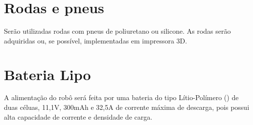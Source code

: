 \vspace{0.5cm}
\section{Rodas e pneus} \label{cap:rodas}
Serão utilizadas rodas com pneus de poliuretano ou silicone. As rodas serão adquiridas ou, se possível, implementadas em 
impressora 3D.


\vspace{0.5cm}
\section{Bateria Lipo} \label{cap:bateria}

A alimentação do robô será feita por uma bateria do tipo Lítio-Polímero () de duas céluas, 11,1V, 300mAh e 
32,5A de corrente máxima de descarga, pois possui alta capacidade de corrente e densidade de carga.
\vspace{0.5cm}


















